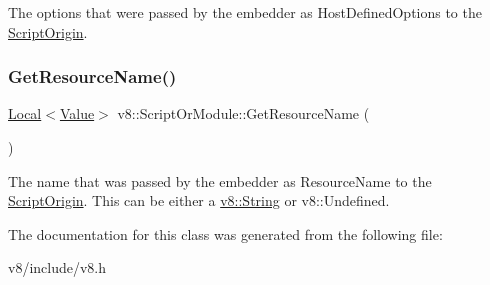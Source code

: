 The options that were passed by the embedder as Host\+Defined\+Options to the \mbox{\hyperlink{classv8_1_1ScriptOrigin}{Script\+Origin}}. \mbox{\label{classv8_1_1ScriptOrModule_a6e35d9dc6e0c22ed4d8c1de071b3b9d9}} 
\subsubsection{\texorpdfstring{Get\+Resource\+Name()}{GetResourceName()}}
{\footnotesize\ttfamily \mbox{\hyperlink{classv8_1_1Local}{Local}}$<$\mbox{\hyperlink{classv8_1_1Value}{Value}}$>$ v8\+::\+Script\+Or\+Module\+::\+Get\+Resource\+Name (\begin{DoxyParamCaption}{ }\end{DoxyParamCaption})}

The name that was passed by the embedder as Resource\+Name to the \mbox{\hyperlink{classv8_1_1ScriptOrigin}{Script\+Origin}}. This can be either a \mbox{\hyperlink{classv8_1_1String}{v8\+::\+String}} or v8\+::\+Undefined. 

The documentation for this class was generated from the following file\+:\begin{DoxyCompactItemize}
\item 
v8/include/v8.\+h\end{DoxyCompactItemize}
